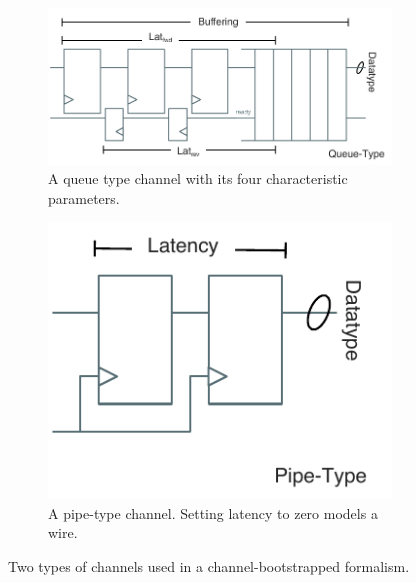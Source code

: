 \begin{figure}[htb]
    \centering
    \begin{subfigure}[t]{0.65\textwidth}
        \captionsetup{margin=0.25cm}
        \includegraphics[width=\columnwidth]{figures/queue-channel.pdf}
        \caption{A queue type channel with its four characteristic parameters.}
        \label{fig:queue-channel}
    \end{subfigure}
    \begin{subfigure}[t]{0.34\textwidth}
        \captionsetup{margin=0.25cm}
        \includegraphics[width=\columnwidth]{figures/pipe-channel.pdf}
        \caption{A pipe-type channel. Setting latency to zero models a wire.}
        \label{fig:pipe-channel}
    \end{subfigure}
    \centering
    \caption{Two types of channels used in a channel-bootstrapped formalism.}
\end{figure}

